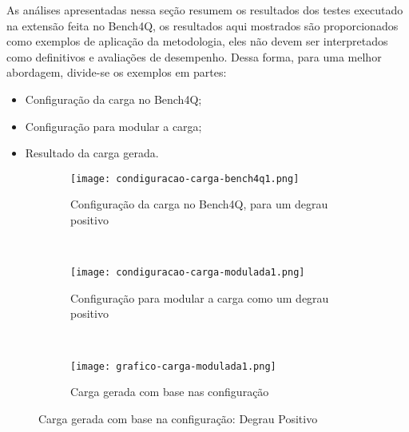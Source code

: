 As análises apresentadas nessa seção resumem os resultados dos testes executado na extensão feita no Bench4Q, os resultados aqui mostrados são proporcionados como exemplos de aplicação da metodologia, eles não devem ser interpretados como definitivos e avaliações de desempenho. Dessa forma, para uma melhor abordagem, divide-se os exemplos em  partes:
\begin{itemize}
	\item Configuração da carga no Bench4Q;
	\item Configuração para modular a carga;
	\item Resultado da carga gerada.
\end{itemize}

\begin{figure}[!htb]
	\begin{subfigure}{\linewidth}
		\centering
		\texttt{[image: condiguracao-carga-bench4q1.png]}
		\caption{Configuração da carga no Bench4Q, para um degrau positivo}
		\label{fig:condiguracao-carga-bench4q1}
	\end{subfigure}\\
	\begin{subfigure}{\linewidth}
		\centering
		\texttt{[image: condiguracao-carga-modulada1.png]}
		\caption{Configuração para modular a carga como um degrau positivo}
		\label{fig:condiguracao-carga-modulada1}
	\end{subfigure}\\[1ex]
	\begin{subfigure}{\linewidth}
		\centering
		\texttt{[image: grafico-carga-modulada1.png]}
		\caption{Carga gerada com base nas configuração}
		\label{fig:grafico-carga-modulada1}
	\end{subfigure}
	\caption{Carga gerada com base na configuração: Degrau Positivo}
	\label{fig:carga-modulada1}
	\fautor
\end{figure}

